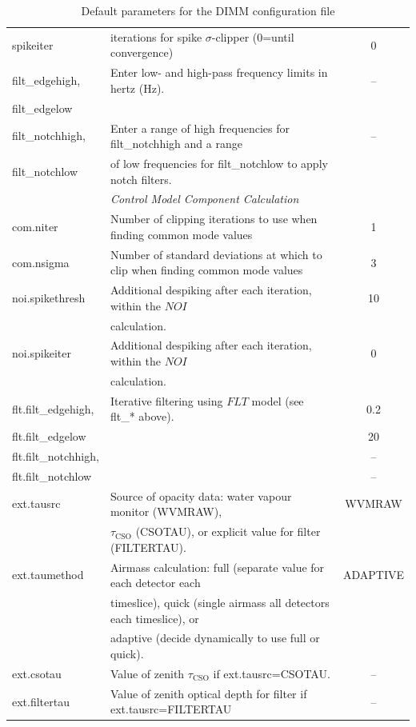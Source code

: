 \documentclass[oneside,11pt]{starlink}
\begin{document}
\begin{table}
\begin{tabular}{llc}
spikeiter        & iterations for spike $\sigma$-clipper (0=until convergence)         & 0 \\
filt\_edgehigh,  & Enter low- and high-pass frequency limits in hertz (Hz).            & -- \\
filt\_edgelow    & & \\
filt\_notchhigh, & Enter a range of high frequencies for filt\_notchhigh and a range   & -- \\
filt\_notchlow   & of low frequencies for filt\_notchlow to apply notch filters.       & \\
\hline
                 & \multicolumn{2}{l}{\em Control Model Component Calculation} \\
\hline
com.niter	 & Number of clipping iterations to use when finding common mode values & 1 \\
com.nsigma	 & Number of standard deviations at which to clip when finding common mode values & 3 \\
noi.spikethresh  & Additional despiking after each iteration, within the $NOI$         & 10 \\
                 & calculation.                                                        & \\
noi.spikeiter    & Additional despiking after each iteration, within the $NOI$         & 0 \\
                 & calculation.                                                        & \\
flt.filt\_edgehigh,  & Iterative filtering using $FLT$ model (see flt\_* above).       & 0.2 \\
flt.filt\_edgelow    &                                                                 & 20 \\
flt.filt\_notchhigh, &                                                                 & -- \\
flt.filt\_notchlow   &                                                                 & -- \\
ext.tausrc       & Source of opacity data: water vapour monitor (WVMRAW),              & WVMRAW \\
                 & $\tau_{\mathrm{CSO}}$ (CSOTAU), or explicit value for filter (FILTERTAU). & \\
ext.taumethod    & Airmass calculation: full (separate value for each detector each    & ADAPTIVE \\
                 & timeslice), quick (single airmass all detectors each timeslice), or & \\
                 & adaptive (decide dynamically to use full or quick).                 & \\
ext.csotau       & Value of zenith $\tau_{\mathrm{CSO}}$ if ext.tausrc=CSOTAU.            & -- \\
ext.filtertau    & Value of zenith optical depth for filter if ext.tausrc=FILTERTAU    & -- \\
\hline
\hline
\end{tabular}
\normalsize
\caption{Default parameters for the DIMM configuration file}
\label{tab:dimmconfig}
\end{table}
\end{document}
